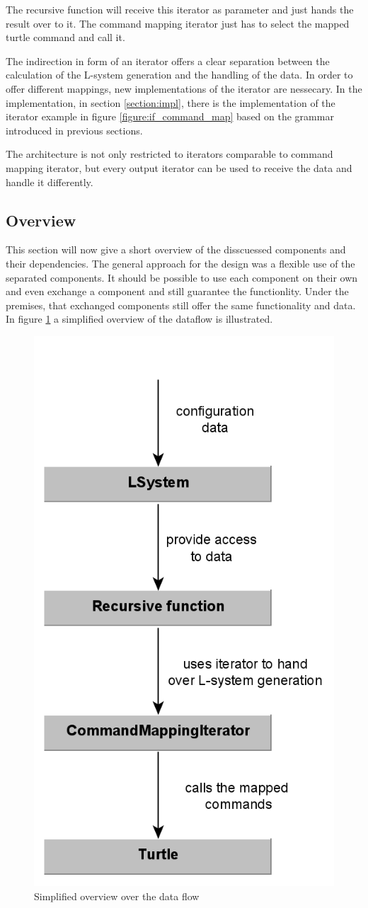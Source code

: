 \documentclass[english]{cpp-hmwk}
\begin{document}
The recursive function will receive this iterator as parameter and just hands the result over to it. The command mapping iterator just has to select the mapped turtle command and call it.

The indirection in form of an iterator offers a clear separation between the calculation of the L-system generation and the handling of the data. In order to offer different mappings, new implementations of the iterator are nessecary. In the implementation, in section \ref{section:impl}, there is the implementation of the iterator example in figure \ref{figure:if_command_map} based on the grammar introduced in previous sections.

The architecture is not only restricted to iterators comparable to command mapping iterator, but every output iterator can be used to receive the data and handle it differently.

\subsection{Overview}
This section will now give a short overview of the disscuessed components and their dependencies. The general approach for the design was a flexible use of the separated components. It should be possible to use each component on their own and even exchange a component and still guarantee the functionlity. Under the premises, that exchanged components still offer the same functionality and data. In figure \ref{figure:overview} a simplified overview of the dataflow is illustrated. 

\begin{figure}[h!]
	\centering
	\includegraphics[width=0.4\columnwidth]{../graphs/LSystem/examples/overview.png}
	\caption{Simplified overview over the data flow}
	\label{figure:overview}
\end{figure}
\end{document}
